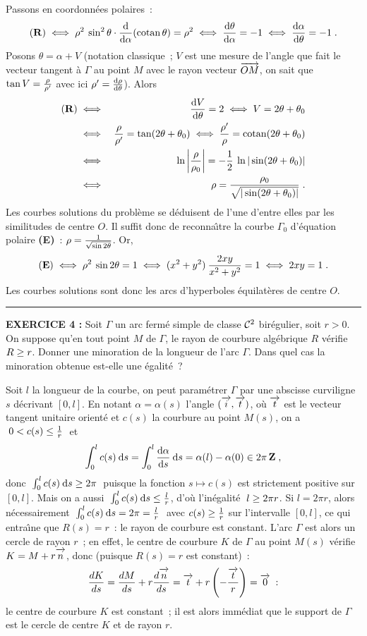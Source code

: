 \documentclass{article}
\begin{document}
Passons en coordonn\'ees polaires~:\vv
$${\bf (R)} \iff \rho^2\>\sin^2\theta\cdot {{\rm d}\over{\rm d}\alpha}(\mathop{\rm cotan}\nolimits\theta)=\rho^2
\iff {{\rm d}\theta\over{\rm d}\alpha}=-1
\iff {{\rm d}\alpha\over{\rm d}\theta}=-1\;.$$
Posons $\theta=\alpha+V$ (notation classique~; $V$ est une mesure de l'angle que fait le vecteur tangent \`a $\Gamma$ au point $M$ avec le rayon vecteur $\vect{OM}$, on sait que $\tan V={\rho\over\rho'}$ avec ici $\rho'={{\rm d}\rho\over{\rm d}\theta}$). Alors\vv
\begin{eqnarray*}
{\bf (R)} & \iff & {{\rm d}V\over{\rm d}\theta}=2 \iff V=2\theta+\theta_0\\
& \iff & {\rho\over\rho'}=\tan(2\theta+\theta_0)\iff {\rho'\over\rho}=\mathop{\rm cotan}\nolimits(2\theta+\theta_0)\\
& \iff & \ln\left|{\rho\over\rho_0}\right|=-{1\over2}\>\ln|\sin(2\theta+\theta_0)|\\
& \iff & \rho={\rho_0\over\sqrt{|\sin(2\theta+\theta_0)|}}\;.
\end{eqnarray*}
Les courbes solutions du probl\`eme se d\'eduisent de l'une d'entre elles par les similitudes de centre $O$. Il suffit donc de reconna\^\i tre la courbe $\Gamma_0$ d'\'equation polaire {\bf (E)}~: $\rho={1\over\sqrt{\sin 2\theta}}$. Or,\vv
$${\bf (E)}\iff \rho^2\>\sin 2\theta=1\iff (x^2+y^2)\>{2xy\over x^2+y^2}=1\iff 2xy=1\;.$$
Les courbes solutions sont donc les arcs d'hyperboles \'equilat\`eres de centre $O$. 

\bsk
\hrule
\bsk

{\bf EXERCICE 4 :}\msk
Soit $\Gamma$ un arc ferm\'e simple de classe ${\cal C}^2$ bir\'egulier, soit $r>0$. On suppose qu'en tout point $M$ de $\Gamma$, le rayon de courbure alg\'ebrique $R$ v\'erifie $R\geq r$. Donner une minoration de la longueur de l'arc $\Gamma$. Dans quel cas la minoration obtenue est-elle une \'egalit\'e~?

\msk
\cl{- - - - - - - - - - - - - - - - - - - - - - - - - - - - - - - }
\msk

Soit $l$ la longueur de la courbe, on peut param\'etrer $\Gamma$ par une abscisse curviligne $s$ d\'ecrivant $[0,l]$. En notant $\alpha=\alpha(s)$ l'angle $(\vect{i},\vect{t})$, o\`u $\vect{t}$ est le vecteur tangent unitaire orient\'e et $c(s)$ la courbure au point $M(s)$, on a $\;0<c(s)\leq{1\over r}\;$ et\vv
$$\int_0^lc(s)\>{\rm d}s=\int_0^l{{\rm d}\alpha\s{\rm d}s}\>{\rm d}s=\alpha(l)-\alpha(0)\in2\pi\zmat\;,$$
donc $\;\int_0^lc(s)\>{\rm d}s\geq 2\pi\;$ puisque la fonction $s\mapsto c(s)$ est strictement positive sur $[0,l]$. Mais on a aussi $\;\int_0^lc(s)\>{\rm d}s\leq{l\over r}$, d'o\`u l'in\'egalit\'e $\;l\geq2\pi r$.
\msk
Si $l=2\pi r$, alors n\'ecessairement $\;\int_0^lc(s)\>{\rm d}s=2\pi={l\over r}\;$ avec $c(s)\geq{1\over r}$ sur l'intervalle $[0,l]$, ce qui entra\^\i ne que $R(s)=r$~: le rayon de courbure est constant. L'arc $\Gamma$ est alors un cercle de rayon $r$~; en effet,
le centre de courbure $K$
de $\Gamma$ au point $M(s)$ v\'erifie $K=M+r\vect{n}$, donc (puisque $R(s)=r$
est constant)~:\vv
$${dK\s ds}={dM\s ds}+r{d\vect{n}\s ds}=\vect{t}+r\lp-{\vect{t}\s r}\rp=\vect{0}\;:$$
le centre de courbure $K$ est constant~; il est alors imm\'ediat que le
support de $\Gamma$ est le cercle de centre $K$ et de rayon $r$.
\end{document}
